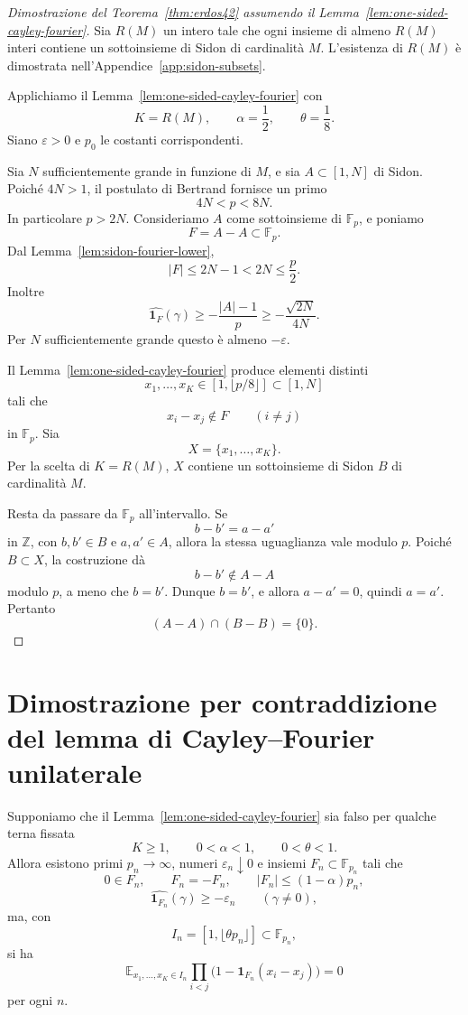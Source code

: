 \documentclass[11pt]{article}
\numberwithin{equation}{section}
\newcommand{\E}{\mathbb E}
\newcommand{\F}{\mathbb F}
\newcommand{\Z}{\mathbb Z}
\newcommand{\1}{\mathbf 1}
\begin{document}
\begin{proof}[Dimostrazione del Teorema~\ref{thm:erdos42} assumendo il Lemma~\ref{lem:one-sided-cayley-fourier}]
Sia \(R(M)\) un intero tale che ogni insieme di almeno \(R(M)\) interi contiene un sottoinsieme di Sidon di cardinalità \(M\). L'esistenza di \(R(M)\) è dimostrata nell'Appendice~\ref{app:sidon-subsets}.

Applichiamo il Lemma~\ref{lem:one-sided-cayley-fourier} con
\[
        K=R(M),\qquad \alpha=\frac12,\qquad \theta=\frac18.
\]
Siano \(\varepsilon>0\) e \(p_0\) le costanti corrispondenti.

Sia \(N\) sufficientemente grande in funzione di \(M\), e sia \(A\subset[1,N]\) di Sidon. Poiché \(4N>1\), il postulato di Bertrand fornisce un primo
\[
        4N<p<8N.
\]
In particolare \(p>2N\). Consideriamo \(A\) come sottoinsieme di \(\F_p\), e poniamo
\[
        F=A-A\subset\F_p.
\]
Dal Lemma~\ref{lem:sidon-fourier-lower},
\[
        |F|\le 2N-1<2N\le\frac p2.
\]
Inoltre
\[
        \widehat{\1_F}(\gamma)
        \ge
        -\frac{|A|-1}{p}
        \ge
        -\frac{\sqrt{2N}}{4N}.
\]
Per \(N\) sufficientemente grande questo è almeno \(-\varepsilon\).

Il Lemma~\ref{lem:one-sided-cayley-fourier} produce elementi distinti
\[
        x_1,\ldots,x_K\in [1,\lfloor p/8\rfloor]\subset[1,N]
\]
tali che
\[
        x_i-x_j\notin F
        \qquad(i\ne j)
\]
in \(\F_p\). Sia
\[
        X=\{x_1,\ldots,x_K\}.
\]
Per la scelta di \(K=R(M)\), \(X\) contiene un sottoinsieme di Sidon \(B\) di cardinalità \(M\).

Resta da passare da \(\F_p\) all'intervallo. Se
\[
        b-b'=a-a'
\]
in \(\Z\), con \(b,b'\in B\) e \(a,a'\in A\), allora la stessa uguaglianza vale modulo \(p\). Poiché \(B\subset X\), la costruzione dà
\[
        b-b'\notin A-A
\]
modulo \(p\), a meno che \(b=b'\). Dunque \(b=b'\), e allora \(a-a'=0\), quindi \(a=a'\). Pertanto
\[
        (A-A)\cap(B-B)=\{0\}.
\]
\end{proof}

\section{Dimostrazione per contraddizione del lemma di Cayley--Fourier unilaterale}

Supponiamo che il Lemma~\ref{lem:one-sided-cayley-fourier} sia falso per qualche terna fissata
\[
        K\ge1,\qquad 0<\alpha<1,\qquad 0<\theta<1.
\]
Allora esistono primi \(p_n\to\infty\), numeri \(\varepsilon_n\downarrow0\) e insiemi \(F_n\subset\F_{p_n}\) tali che
\[
        0\in F_n,\qquad F_n=-F_n,\qquad |F_n|\le(1-\alpha)p_n,
\]
\[
        \widehat{\1_{F_n}}(\gamma)\ge-\varepsilon_n
        \qquad(\gamma\ne0),
\]
ma, con
\[
        I_n=[1,\lfloor\theta p_n\rfloor]\subset\F_{p_n},
\]
si ha
\[
        \E_{x_1,\ldots,x_K\in I_n}
        \prod_{i<j}
        \bigl(1-\1_{F_n}(x_i-x_j)\bigr)=0
\]
per ogni \(n\).
\end{document}

